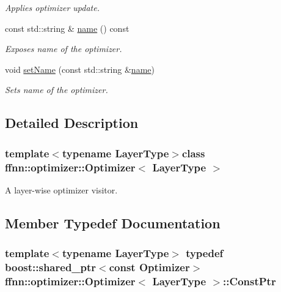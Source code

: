 \begin{DoxyCompactItemize}
\begin{DoxyCompactList}\small\item\em Applies optimizer update. \end{DoxyCompactList}\item 
const std\-::string \& \hyperlink{classffnn_1_1optimizer_1_1_optimizer_a9c472d1e2ef75decdae1cf2db7582582}{name} () const 
\begin{DoxyCompactList}\small\item\em Exposes name of the optimizer. \end{DoxyCompactList}\item 
void \hyperlink{classffnn_1_1optimizer_1_1_optimizer_ab9aa028897eed9617b6439e1ea56a1ee}{set\-Name} (const std\-::string \&\hyperlink{classffnn_1_1optimizer_1_1_optimizer_a9c472d1e2ef75decdae1cf2db7582582}{name})
\begin{DoxyCompactList}\small\item\em Sets name of the optimizer. \end{DoxyCompactList}\end{DoxyCompactItemize}


\subsection{Detailed Description}
\subsubsection*{template$<$typename Layer\-Type$>$class ffnn\-::optimizer\-::\-Optimizer$<$ Layer\-Type $>$}

A layer-\/wise optimizer visitor. 

\subsection{Member Typedef Documentation}
\hypertarget{classffnn_1_1optimizer_1_1_optimizer_a5d62c55f6f830e993ffe801fb17a1c3a}{
\subsubsection[{Const\-Ptr}]{\setlength{\rightskip}{0pt plus 5cm}template$<$typename Layer\-Type$>$ typedef boost\-::shared\-\_\-ptr$<$const {\bf Optimizer}$>$ {\bf ffnn\-::optimizer\-::\-Optimizer}$<$ Layer\-Type $>$\-::{\bf Const\-Ptr}}}\label{classffnn_1_1optimizer_1_1_optimizer_a5d62c55f6f830e993ffe801fb17a1c3a}


